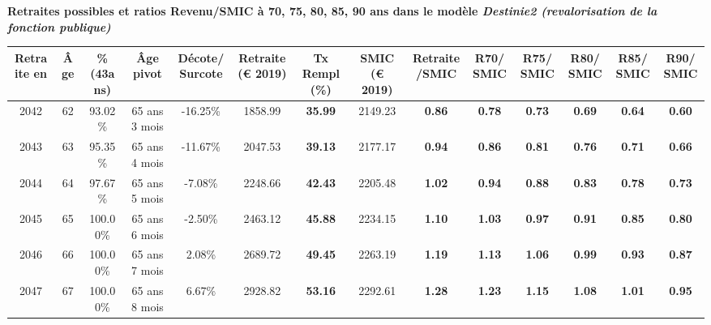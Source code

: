  \vspace{0.1cm} 
{\bf \noindent Retraites possibles et ratios Revenu/SMIC à 70, 75, 80, 85, 90 ans dans le modèle \emph{Destinie2 (revalorisation de la fonction publique)}}  
 
\begin{adjustbox}{max width=\textwidth} 
\begin{tabular}[htb]{|c|c||c|c|c||c|c||c|c||c|c|c|c|c|} 
\hline 
 Retraite en &  Âge &  \%(43ans) &  Âge pivot &  Décote/Surcote &  Retraite (\euro{} 2019) &  Tx Rempl(\%) &  SMIC (\euro{} 2019) &  Retraite/SMIC &  R70/SMIC &  R75/SMIC &  R80/SMIC &  R85/SMIC &  R90/SMIC \\ 
\hline \hline 
 2042 &  62 &  93.02\% &  65 ans 3 mois &  -16.25\% &  1858.99 &  {\bf 35.99} &  2149.23 &  {\bf {\color{red} 0.86}} &  {\bf {\color{red} 0.78}} &  {\bf {\color{red} 0.73}} &  {\bf {\color{red} 0.69}} &  {\bf {\color{red} 0.64}} &  {\bf {\color{red} 0.60}} \\ 
\hline 
 2043 &  63 &  95.35\% &  65 ans 4 mois &  -11.67\% &  2047.53 &  {\bf 39.13} &  2177.17 &  {\bf {\color{red} 0.94}} &  {\bf {\color{red} 0.86}} &  {\bf {\color{red} 0.81}} &  {\bf {\color{red} 0.76}} &  {\bf {\color{red} 0.71}} &  {\bf {\color{red} 0.66}} \\ 
\hline 
 2044 &  64 &  97.67\% &  65 ans 5 mois &  -7.08\% &  2248.66 &  {\bf 42.43} &  2205.48 &  {\bf 1.02} &  {\bf {\color{red} 0.94}} &  {\bf {\color{red} 0.88}} &  {\bf {\color{red} 0.83}} &  {\bf {\color{red} 0.78}} &  {\bf {\color{red} 0.73}} \\ 
\hline 
 2045 &  65 &  100.00\% &  65 ans 6 mois &  -2.50\% &  2463.12 &  {\bf 45.88} &  2234.15 &  {\bf 1.10} &  {\bf 1.03} &  {\bf {\color{red} 0.97}} &  {\bf {\color{red} 0.91}} &  {\bf {\color{red} 0.85}} &  {\bf {\color{red} 0.80}} \\ 
\hline 
 2046 &  66 &  100.00\% &  65 ans 7 mois &  2.08\% &  2689.72 &  {\bf 49.45} &  2263.19 &  {\bf 1.19} &  {\bf 1.13} &  {\bf 1.06} &  {\bf {\color{red} 0.99}} &  {\bf {\color{red} 0.93}} &  {\bf {\color{red} 0.87}} \\ 
\hline 
 2047 &  67 &  100.00\% &  65 ans 8 mois &  6.67\% &  2928.82 &  {\bf 53.16} &  2292.61 &  {\bf 1.28} &  {\bf 1.23} &  {\bf 1.15} &  {\bf 1.08} &  {\bf 1.01} &  {\bf {\color{red} 0.95}} \\ 
\hline 
\hline 
\end{tabular} 
\end{adjustbox} 
 
 \vspace{0.1cm} 

